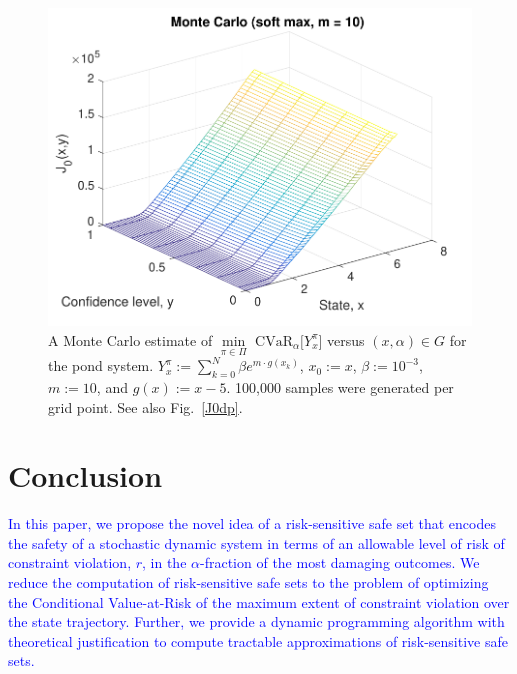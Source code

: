 \documentclass[letterpaper, 10 pt, conference]{ieeeconf}  %
\begin{document}
\begin{figure}[thpb]
      \centering
      \includegraphics[scale=0.5]{monte_carlo_sum_sept112018.pdf}
      \caption{A Monte Carlo estimate of ${\underset{\pi \in \Pi}\min} \text{ CVaR}_\alpha \big[ Y_x^\pi \big]$ versus $(x, \alpha) \in G$ for the pond system.
	  $Y_x^\pi := \sum_{k=0}^N \beta e^{m \cdot g(x_k)}$, $x_0 := x$, $\beta := 10^{-3}$, $m := 10$, and $g(x) := x-5$.
	  100,000 samples were generated per grid point. See also Fig.~\ref{J0dp}.}
      \label{J0mc}
\end{figure}

\section{Conclusion}\label{conc}
\textcolor{blue}{In this paper, we propose the novel idea of a risk-sensitive safe set
that encodes the safety of a stochastic dynamic system in terms of an allowable level of risk of constraint violation, $r$, 
in the $\alpha$-fraction of the most damaging outcomes.
We reduce the computation of risk-sensitive safe sets to the problem of optimizing 
the Conditional Value-at-Risk of the maximum extent of constraint violation over the state trajectory.
Further, we provide a dynamic programming algorithm with theoretical justification to compute tractable approximations of risk-sensitive safe sets.}
\end{document}
